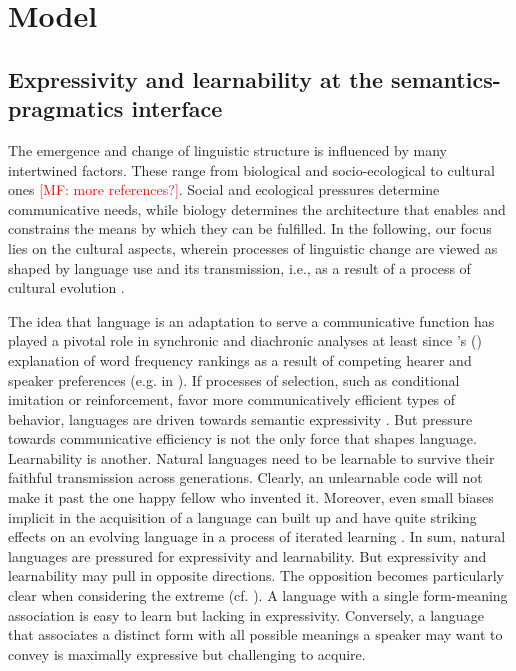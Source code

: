 \documentclass[a4paper]{article}
\newcommand{\citeposs}[2][]{\citeauthor{#2}'s (\citeyear[#1]{#2})}
\newcommand{\mf}[1]{\textcolor{Red}{[MF: #1]}}
\begin{document}
\section{Model}
\label{sec:model}

\subsection{Expressivity and learnability at the semantics-pragmatics interface}

The emergence and change of linguistic structure is influenced by many intertwined
factors. These range from biological and socio-ecological to cultural ones \citep{steels:2011}
\mf{more references?}. Social and ecological pressures determine communicative needs, while
biology determines the architecture that enables and constrains the means by which they can be
fulfilled. In the following, our focus lies on the cultural aspects, wherein processes of
linguistic change are viewed as shaped by language use and its transmission, i.e., as a result
of a process of cultural evolution
\citep{Pagel2009:Human-Language-,ThompsonKirby2016:Culture-Shapes-}.

The idea that language is an adaptation to serve a communicative function has played a pivotal
role in synchronic and diachronic analyses at least since \citeposs{zipf:1949} explanation of
word frequency rankings as a result of competing hearer and speaker preferences (e.g. in
\citealt{martinet:1962, horn:1984,jaeger+vRooij:2007,jaeger:2007,
  piantadosi:2014,kirby+etal:2015}). If processes of selection, such as conditional imitation
or reinforcement, favor more communicatively efficient types of behavior, languages are driven
towards semantic expressivity \citep[e.g.][]{nowak+krakauer:1999,Skyrms2010:Signals}. But
pressure towards communicative efficiency is not the only force that shapes
language. Learnability is another. Natural languages need to be learnable to survive their
faithful transmission across generations. Clearly, an unlearnable code will not make it past
the one happy fellow who invented it. Moreover, even small biases implicit in the acquisition
of a language can built up and have quite striking effects on an evolving language in a process
of iterated learning
\citep{KirbyHurford2002:The-Emergence-o,SmithKirby2003:Iterated-Learni,kirby+etal:2014}. In
sum, natural languages are pressured for expressivity and learnability. But expressivity and
learnability may pull in opposite directions. The opposition becomes particularly clear when
considering the extreme (cf. \citealt{kemp+regier:2012,kirby+etal:2015}). A language with a
single form-meaning association is easy to learn but lacking in expressivity. Conversely, a
language that associates a distinct form with all possible meanings a speaker may want to
convey is maximally expressive but challenging to acquire.
\end{document}
